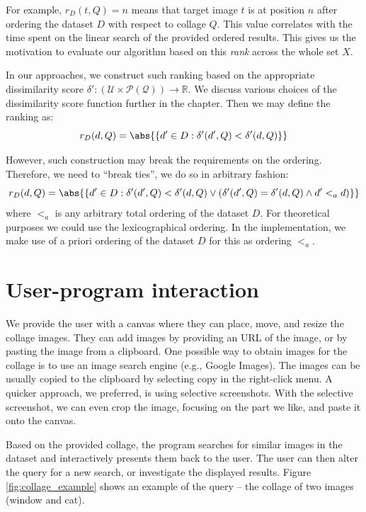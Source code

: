 
For example, $r_D(t, Q) = n$ means that target image $t$ is at position $n$ after ordering the dataset $D$ with respect to collage $Q$. This value correlates with the time spent on the linear search of the provided ordered results. This gives us the motivation to evaluate our algorithm based on this \emph{rank} across the whole set $X$.

In our approaches, we construct such ranking based on the appropriate dissimilarity score $\delta': (\mathcal{U} \times \mathcal{P(Q)}) \rightarrow \mathbb{R}$. We discuss various choices of the dissimilarity score function further in the chapter. Then we may define the ranking as:
$$
    r_D(d, Q) = \abs{\{d' \in D : \delta'(d', Q) < \delta'(d, Q)\}}
$$


However, such construction may break the requirements on the ordering. Therefore, we need to ``break ties'', we do so in arbitrary fashion:
$$
    r_D(d, Q) = \abs{\left\{d' \in D : \delta'(d', Q) < \delta'(d, Q) \lor \left(\delta'(d', Q) = \delta'(d, Q) \land d' <_a d\right)\right\}}
$$
where $<_a$ is any arbitrary total ordering of the dataset $D$. For theoretical purposes we could use the lexicographical ordering. In the implementation, we make use of a priori ordering of the dataset $D$ for this as ordering $<_a$.



\section{User-program interaction}

We provide the user with a canvas where they can place, move, and resize the collage images. They can add images by providing an URL of the image, or by pasting the image from a clipboard. One possible way to obtain images for the collage is to use an image search engine (e.g., Google Images). The images can be usually copied to the clipboard by selecting copy in the right-click menu. A quicker approach, we preferred, is using selective screenshots. With the selective screenshot, we can even crop the image, focusing on the part we like, and paste it onto the canvas.

Based on the provided collage, the program searches for similar images in the dataset and interactively presents them back to the user. The user can then alter the query for a new search, or investigate the displayed results. Figure \ref{fig:collage_example} shows an example of the query -- the collage of two images (window and cat). 

